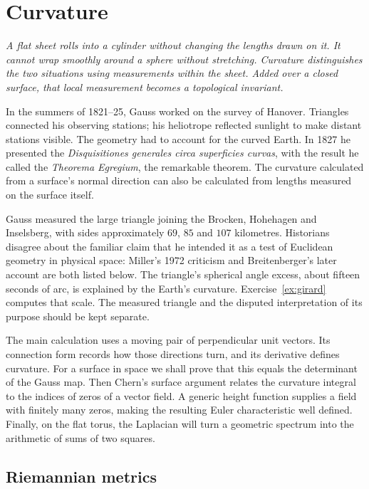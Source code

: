 \chapter{Curvature}

\begin{center}\itshape
A flat sheet rolls into a cylinder without changing the lengths drawn on it. It cannot wrap smoothly around a sphere without stretching. Curvature distinguishes the two situations using measurements within the sheet. Added over a closed surface, that local measurement becomes a topological invariant.
\end{center}

In the summers of 1821--25, Gauss worked on the survey of Hanover. Triangles connected his observing stations; his heliotrope reflected sunlight to make distant stations visible. The geometry had to account for the curved Earth. In 1827 he presented the \emph{Disquisitiones generales circa superficies curvas}, with the result he called the \emph{Theorema Egregium}, the remarkable theorem. The curvature calculated from a surface's normal direction can also be calculated from lengths measured on the surface itself.

Gauss measured the large triangle joining the Brocken, Hohehagen and Inselsberg, with sides approximately $69$, $85$ and $107$ kilometres. Historians disagree about the familiar claim that he intended it as a test of Euclidean geometry in physical space: Miller's 1972 criticism and Breitenberger's later account are both listed below. The triangle's spherical angle excess, about fifteen seconds of arc, is explained by the Earth's curvature. Exercise~\ref{ex:girard} computes that scale. The measured triangle and the disputed interpretation of its purpose should be kept separate.

The main calculation uses a moving pair of perpendicular unit vectors. Its connection form records how those directions turn, and its derivative defines curvature. For a surface in space we shall prove that this equals the determinant of the Gauss map. Then Chern's surface argument relates the curvature integral to the indices of zeros of a vector field. A generic height function supplies a field with finitely many zeros, making the resulting Euler characteristic well defined. Finally, on the flat torus, the Laplacian will turn a geometric spectrum into the arithmetic of sums of two squares.

\section{Riemannian metrics}


